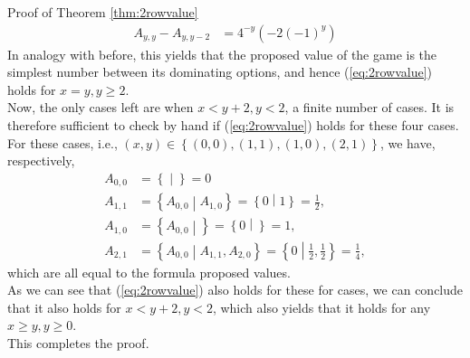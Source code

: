 \begin{proof2}{Proof of Theorem \ref{thm:2rowvalue}}
\begin{equation*}
\begin{split}
A_{y,y}-A_{y,y-2}&=4^{-y}\left(-2(-1)^y\right)
\end{split}
\end{equation*}
In analogy with before, this yields that the proposed value of the game is the simplest number between its dominating options, and hence (\ref{eq:2rowvalue}) holds for $x=y,y\ge2$.
\\
Now, the only cases left are when $x< y+2,y<2$, a finite number of cases. It is therefore sufficient to check by hand if (\ref{eq:2rowvalue}) holds for these four cases. For these cases, i.e., $(x,y)\in\left\{(0,0),(1,1),(1,0),(2,1)\right\}$, we have, respectively, 
\begin{align*}
A_{0,0}&=\left\{\middle|\right\}=0\\
A_{1,1}&=\left\{A_{0,0}\middle|A_{1,0}\right\}=\left\{0\middle|1\right\}=\frac{1}{2},\\
A_{1,0}&=\left\{A_{0,0}\middle|\right\}=\left\{0\middle|\right\}=1,\\
A_{2,1}&=\left\{A_{0,0}\middle|A_{1,1},A_{2,0}\right\}=\left\{0\middle|\frac{1}{2},\frac{1}{2}\right\}=\frac{1}{4},
\end{align*} 
which are all equal to the formula proposed values.
\\
As we can see that (\ref{eq:2rowvalue}) also holds for these for cases, we can conclude that it also holds for $x< y+2,y<2$, which also yields that it holds for any $x\ge y,y\ge0$. 
\\
This completes the proof.
\end{proof2}